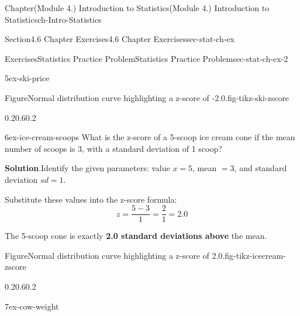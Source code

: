 \documentclass[oneside,10pt,]{book}
\newcommand{\blocktitlefont}{\relax}
\newcommand{\terminology}[1]{\textbf{#1}}
\begin{document}
\begin{chapterptx}{Chapter}{(Module 4.) Introduction to Statistics}{}{(Module 4.) Introduction to Statistics}{}{}{ch-Intro-Statistics}
\begin{sectionptx}{Section}{4.6 Chapter Exercises}{}{4.6 Chapter Exercises}{}{}{sec-stat-ch-ex}
\begin{exercises-subsection-numberless}{Exercises}{Statistics Practice Problem}{}{Statistics Practice Problem}{}{}{sec-stat-ch-ex-2}
\begin{divisionexercise}{5}{}{}{ex-ski-price}
\begin{figureptx}{Figure}{Normal distribution curve highlighting a z-score of -2.0.}{fig-tikz-ski-zscore}{}
\begin{image}{0.2}{0.6}{0.2}{}
{\begin{tikzpicture}[
  declare function={normalpdf(\x,\mu,\sigma)=1/(\sigma*sqrt(2*pi))*exp(-(\x-\mu)^2/(2*\sigma^2));}
]
\end{tikzpicture}%
}%
\end{image}%
\tcblower
\end{figureptx}%
\end{divisionexercise}%
\begin{divisionexercise}{6}{}{}{ex-ice-cream-scoops}%
What is the z-score of a 5-scoop ice cream cone if the mean number of scoops is 3, with a standard deviation of 1 scoop?%
\par\smallskip%
\noindent\textbf{\blocktitlefont Solution}.\hypertarget{ex-ice-cream-scoops-2}{}\quad{}Identify the given parameters: value \(x = 5\), mean \(= 3\), and standard deviation \(sd = 1\).%
\par
Substitute these values into the z-score formula:%
\begin{equation*}
z = \frac{5 - 3}{1} = \frac{2}{1} = 2.0
\end{equation*}
%
\par
The 5-scoop cone is exactly \terminology{2.0 standard deviations above} the mean.%
\begin{figureptx}{Figure}{Normal distribution curve highlighting a z-score of 2.0.}{fig-tikz-icecream-zscore}{}%
\begin{image}{0.2}{0.6}{0.2}{}%
%
\end{image}%
\tcblower
\end{figureptx}%
\end{divisionexercise}%
\begin{divisionexercise}{7}{}{}{ex-cow-weight}%

\end{divisionexercise}
\end{exercises-subsection-numberless}
\end{sectionptx}
\end{chapterptx}
\end{document}
